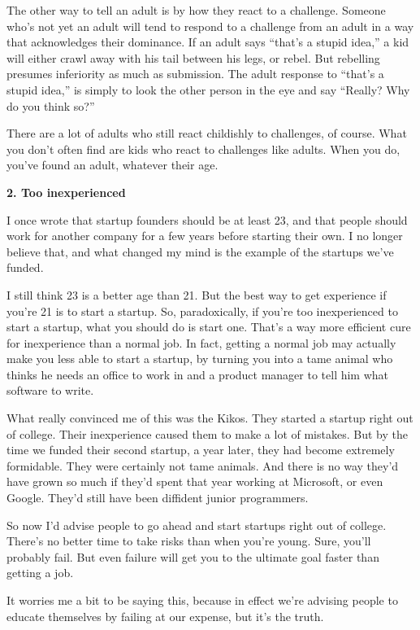 The other way to tell an adult is by how they react to a challenge.
Someone who's not yet an adult will tend to respond to a challenge from
an adult in a way that acknowledges their dominance. If an adult says
``that's a stupid idea,'' a kid will either crawl away with his tail
between his legs, or rebel. But rebelling presumes inferiority as much
as submission. The adult response to ``that's a stupid idea,'' is simply
to look the other person in the eye and say ``Really? Why do you think
so?''

There are a lot of adults who still react childishly to challenges, of
course. What you don't often find are kids who react to challenges like
adults. When you do, you've found an adult, whatever their age.

\textbf{2. Too inexperienced}

I once wrote that startup founders should be at least 23, and that
people should work for another company for a few years before starting
their own. I no longer believe that, and what changed my mind is the
example of the startups we've funded.

I still think 23 is a better age than 21. But the best way to get
experience if you're 21 is to start a startup. So, paradoxically, if
you're too inexperienced to start a startup, what you should do is start
one. That's a way more efficient cure for inexperience than a normal
job. In fact, getting a normal job may actually make you less able to
start a startup, by turning you into a tame animal who thinks he needs
an office to work in and a product manager to tell him what software to
write.

What really convinced me of this was the Kikos. They started a startup
right out of college. Their inexperience caused them to make a lot of
mistakes. But by the time we funded their second startup, a year later,
they had become extremely formidable. They were certainly not tame
animals. And there is no way they'd have grown so much if they'd spent
that year working at Microsoft, or even Google. They'd still have been
diffident junior programmers.

So now I'd advise people to go ahead and start startups right out of
college. There's no better time to take risks than when you're young.
Sure, you'll probably fail. But even failure will get you to the
ultimate goal faster than getting a job.

It worries me a bit to be saying this, because in effect we're advising
people to educate themselves by failing at our expense, but it's the
truth.

